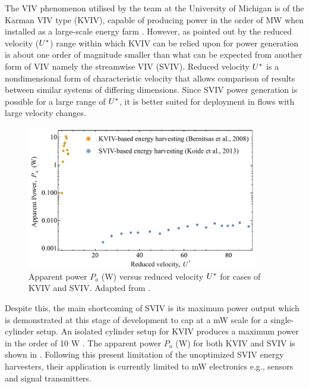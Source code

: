 \documentclass[oneside]{utmthesis}
\begin{document}
The VIV phenomenon utilised by the team at the University of Michigan is of the Karman VIV type (KVIV), capable of producing power in the order of MW when installed as a large-scale energy farm \citep{Raghavan2007}. However, as pointed out by \citet{Koide2013} the reduced velocity ($U^{*}$) range within which KVIV can be relied upon for power generation is about one order of magnitude smaller than what can be expected from another form of VIV namely the streamwise VIV (SVIV). Reduced velocity $U^{*}$ is a nondimensional form of characteristic velocity that allows comparison of results between similar systems of differing dimensions. Since SVIV power generation is possible for a large range of $U^{*}$, it is better suited for deployment in flows with large velocity changes.

\begin{figure}
  \centering
  \includegraphics[width=0.9\textwidth]{figs/apparentPowerKoide}
  \caption{Apparent power $P_a $ (W) versus reduced velocity $U^{*}$ for cases of KVIV and SVIV. Adapted from \citet{Koide2013}.}
  \label{fig:apparentPowerKoide}
\end{figure}

Despite this, the main shortcoming of SVIV is its maximum power output which is demonstrated at this stage of development to cap at a mW scale for a single-cylinder setup. An isolated cylinder setup for KVIV produces a maximum power in the order of 10 W \citep{Bernitsas2009}. The apparent power $P_a$ (W) for both KVIV and SVIV is shown in \citet{Koide2013}. Following this present limitation of the unoptimized SVIV energy harvesters, their application is currently limited to mW electronics e.g., sensors and signal transmitters.

\end{document}
